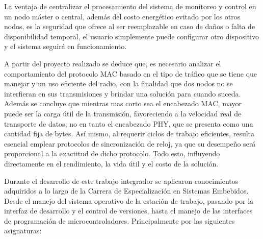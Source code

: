 La ventaja de centralizar el procesamiento del sistema de monitoreo y control en un nodo máster o central, además del costo energético evitado por los otros nodos, es la seguridad que ofrece al ser reemplazable en caso de daños o falta de disponibilidad temporal, el usuario simplemente puede configurar otro dispositivo y el sistema seguirá en funcionamiento.

A partir del proyecto realizado se deduce que, es necesario analizar el comportamiento del protocolo MAC basado en el tipo de tráfico que se tiene que manejar y un uso eficiente del radio, con la finalidad que dos nodos no se interfieran en sus transmisiones y brindar una solución para cuando suceda. Además se concluye que mientras mas corto sea el encabezado MAC, mayor puede ser la carga útil de la transmisión, favoreciendo a la velocidad real de transporte de datos; no en tanto el encabezado PHY, que se presenta como una cantidad fija de bytes. Así mismo, al requerir ciclos de trabajo eficientes, resulta esencial emplear protocolos de sincronización de reloj, ya que su desempeño será proporcional a la exactitud de dicho protocolo. Todo esto, influyendo directamente en el rendimiento, la vida útil y el costo de la solución.


\medskip
Durante el desarrollo de este trabajo integrador se aplicaron conocimientos adquiridos a lo largo de la Carrera de Especialización en Sistemas Embebidos. Desde el manejo del sistema operativo de la estación de trabajo, pasando por la interfaz de desarrollo y el control de versiones, hasta el manejo de las interfaces de programación de microcontroladores. Principalmente por las siguientes asignaturas: 

